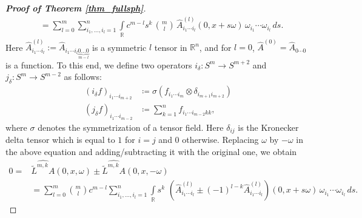 \documentclass[11pt,a4paper,reqno]{amsart}
\begin{document}
\begin{proof}[\textbf{Proof of Theorem \ref{thm_fullsph}}]
\begin{equation}
\begin{aligned}
				&=\sum\limits_{l=0}^m\sum_{i_1,\dots ,i_l=1}^{n} \int\limits_{\mathbb{R}}c^{m-l} s^k\,  \binom{m}{l}\,\hat{A}^{(l)}_{i_1 \cdots i_l}(0,x+s\omega)\,\omega_{i_1}\cdots \omega_{i_l} \, ds.
		\end{aligned}\end{equation}
		Here $\hat{A}^{(l)}_{i_1 \cdots i_l}:= \hat{A}_{i_1\cdots i_l\underbrace{0\dots 0}_{m-l} }$ is a symmetric $l$ tensor in $\mathbb{R}^n$, and for $l=0$, $\hat{A}^{(0)} = \hat{A}_{0\cdots 0}$ is a function. To this end, we define two operators $i_{\delta}:S^m\rightarrow S^{m+2} $ and $j_{\delta}:S^{m}\rightarrow S^{m-2}$ as follows:
\begin{align}
(i_{\delta}f )_{i_1 \cdots i_{m+2}}&\coloneqq \sigma(f_{i_1\cdots i_m} \otimes \delta_{i_{m+1}i_{m+2}})\label{def_of_i}\\
(j_{\delta} f)_{i_1\cdots i_{m-2}}&\coloneqq \sum\limits_{k=1}^n f_{i_1\cdots i_{m-2}kk},\label{def_of_j}
\end{align}
where $\sigma$ denotes the symmetrization of a tensor field. Here $\delta_{ij}$ is the Kronecker delta tensor which is equal to $1$ for $i=j$ and $0$ otherwise.
Replacing $\omega$ by $-\omega$ in the above equation and adding/subtracting it with the original one, we obtain
\begin{align}\label{eq_1.5}
0=&  \widehat{\tilde{L}^{m,k}A}(0,x,\omega)\pm \widehat{\tilde{L}^{m,k}A}(0,x,-\omega)\nonumber \\
&=\sum\limits_{l=0}^m \binom{m}{l}c^{m-l}\sum_{i_1,\dots ,i_l=1}^{n} \int\limits_{\mathbb{R}} s^k\, \,\left( \hat{A}_{i_1\cdots i_l}^{(l)} \pm (-1)^{l-k}\hat{A}_{i_1\cdots i_l}^{(l)}\right) (0,x+s\omega)\,\omega_{i_1}\cdots \omega_{i_l} \, ds.
\end{align}
		

\end{proof}
\end{document}
